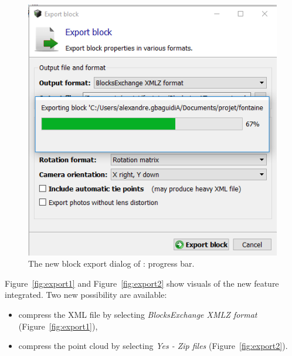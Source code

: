 \begin{figure}
  \centering
  \includegraphics[scale=0.7]{img/export3.png}
  \caption{The new block export dialog of \CC: progress bar.}
  \label{fig:export3}
\end{figure}

Figure~\ref{fig:export1} and Figure~\ref{fig:export2} show visuals of the new feature integrated. Two new possibility are available:
\begin{itemize}
\item compress the XML file by selecting \emph{BlocksExchange XMLZ format} (Figure~\ref{fig:export1}),
\item compress the point cloud by selecting \emph{Yes - Zip files} (Figure~\ref{fig:export2}).
\end{itemize}
